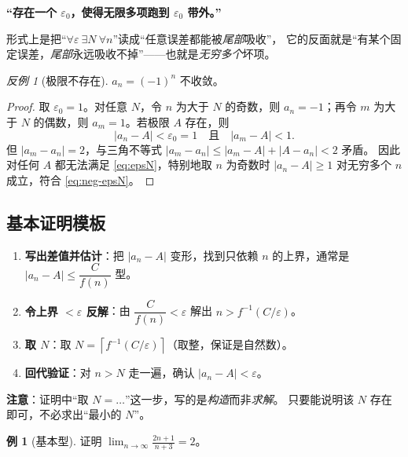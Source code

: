 \documentclass[11pt,a4paper]{ctexart}
\theoremstyle{definition}
\newtheorem{example}[theorem]{例}
\theoremstyle{remark}
\newtheorem*{counter}{反例}
\newcommand{\eps}{\varepsilon}
\newcommand{\abs}[1]{\left\lvert #1 \right\rvert}
\newcommand{\limn}{\lim_{n\to\infty}}
\begin{document}
\begin{keybox}[否定形式的记忆口诀]
\textbf{“存在一个 $\eps_0$，使得无限多项跑到 $\eps_0$ 带外。”}
\par\smallskip
形式上是把“$\forall\eps\ \exists N\ \forall n$”读成“任意误差都能被\emph{尾部}吸收”，
它的反面就是“有某个固定误差，\emph{尾部}永远吸收不掉”——也就是\emph{无穷多个}坏项。
\end{keybox}

\begin{counter}[极限不存在]\label{counter:oscillate}
$a_n=(-1)^n$ 不收敛。
\end{counter}

\begin{proof}
取 $\eps_0=1$。对任意 $N$，令 $n$ 为大于 $N$ 的奇数，则 $a_n=-1$；再令 $m$ 为大于 $N$
的偶数，则 $a_m=1$。若极限 $A$ 存在，则
\[
  \abs{a_n-A}<\eps_0=1\quad\text{且}\quad\abs{a_m-A}<1 .
\]
但 $\abs{a_m-a_n}=2$，与三角不等式 $\abs{a_m-a_n}\le\abs{a_m-A}+\abs{A-a_n}<2$ 矛盾。
因此对任何 $A$ 都无法满足 \eqref{eq:epsN}，特别地取 $n$ 为奇数时
$\abs{a_n-A}\ge1$ 对无穷多个 $n$ 成立，符合 \eqref{eq:neg-epsN}。

\end{proof}

\subsection{基本证明模板}

\begin{keybox}[$\eps$-$N$ 证明的四步模板]
\begin{enumerate}[label=\textbf{步骤 \arabic*.}, leftmargin=4.2em]
  \item \textbf{写出差值并估计}：把 $\abs{a_n-A}$ 变形，找到只依赖 $n$ 的上界，通常是
        $\abs{a_n-A}\le \dfrac{C}{f(n)}$ 型。
  \item \textbf{令上界 $<\eps$ 反解}：由 $\dfrac{C}{f(n)}<\eps$ 解出 $n>f^{-1}(C/\eps)$。
  \item \textbf{取 $N$}：取 $N=\left\lceil f^{-1}(C/\eps)\right\rceil$（取整，保证是自然数）。
  \item \textbf{回代验证}：对 $n>N$ 走一遍，确认 $\abs{a_n-A}<\eps$。
\end{enumerate}
\textbf{注意}：证明中“取 $N=\dots$”这一步，写的是\emph{构造}而非\emph{求解}。
只要能说明该 $N$ 存在即可，不必求出“最小的 $N$”。
\end{keybox}

\begin{example}[基本型]\label{ex:basic}
证明 $\displaystyle\limn\frac{2n+1}{n+3}=2$。
\end{example}
\end{document}
